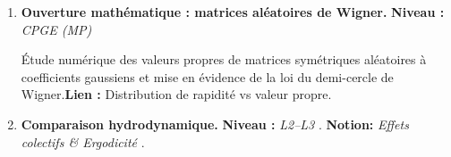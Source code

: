 {\begin{enumerate}[label =\textbf{\arabic*.}, ref=\arabic*]
          (Après les cours de mécanique quantique.) Comparaison entre l’équation de {\bf \textsf{Schrödinger}} à une particule et la version à $N=2$ du modèle de {\bf \textsf{(LL)}} (eq.~\eqref{eq.LL}). On montre comment cette dernière se ramène, dans le cas $N=2$, à un problème effectif à une particule, de manière analogue au traitement classique, et on en déduit les états stationnaires. On compare ensuite ces solutions avec l’état \eqref{eq.StationaryState}.

          Dans le cas périodique, on introduit la quantification des nombres d’onde pour
          $N=1$ puis $N=2$, et on compare avec les équations de {\bf \textsf{(BA)}}
          (eq.~\eqref{eq.BA}). On discute enfin la limite de gaz parfait (absence
          d’interaction et diamètre nul), et l’on met en évidence l’impact des
          interactions sur la structure des états accessibles et sur la dynamique
          collective.




    \item {\bf \textsf{Ouverture mathématique : matrices aléatoires de Wigner.}} \textbf{Niveau :} {\em CPGE (MP)}

          Étude numérique des valeurs propres de matrices symétriques aléatoires à coefficients gaussiens et mise en évidence de la loi du demi-cercle de Wigner.\textbf{Lien :} Distribution de rapidité vs valeur propre.

    \item {\bf \textsf{Comparaison hydrodynamique.}}  \textbf{Niveau :} {\em L2--L3} . \textbf{Notion:} {\em Effets colectifs \& Ergodicité }.


\end{enumerate}}
